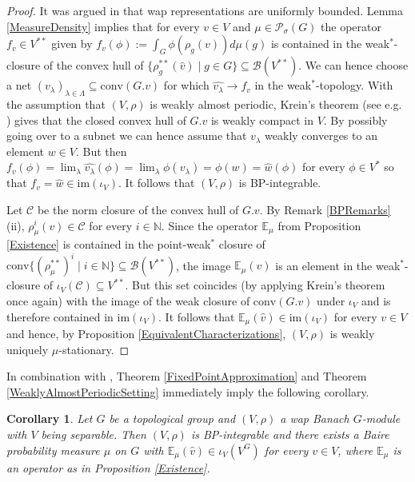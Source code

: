 \documentclass[a4paper,11pt,reqno]{amsart}
\numberwithin{equation}{section}
\newtheorem{corollary}[theorem]{Corollary}
\theoremstyle{definition}
\theoremstyle{remark}
\theoremstyle{remark}
\begin{document}
\begin{proof} It was argued in \cite{BaderRosendalSauer} that wap representations are uniformly bounded. Lemma \ref{MeasureDensity} implies that for every $v\in V$ and $\mu\in\mathcal{P}_{\sigma}(G)$ the operator $f_{v}\in V^{\ast\ast}$ given by $f_{v}(\phi):=\int_{G}\phi\left(\rho_{g}(v)\right)d\mu(g)$ is contained in the weak$^{\ast}$-closure of the convex hull of $\{\rho_{g}^{\ast\ast}(\widehat{v})\mid g\in G\}\subseteq\mathcal{B}(V^{\ast\ast})$. We can hence choose a net $(v_{\lambda})_{\lambda\in\Lambda}\subseteq\text{conv}(G.v)$ for which $\widehat{v_{\lambda}}\rightarrow f_{v}$ in the weak$^{\ast}$-topology. With the assumption that $(V,\rho)$ is weakly almost periodic, Krein's theorem (see e.g. \cite[Theorem 3.133]{FHHMZ}) gives that the closed convex hull of $G.v$ is weakly compact in $V$. By possibly going over to a subnet we can hence assume that $v_{\lambda}$ weakly converges to an element $w\in V$. But then $f_{v}(\phi)=\lim_{\lambda}\widehat{v_{\lambda}}(\phi)=\lim_{\lambda}\phi(v_{\lambda})=\phi(w)=\widehat{w}(\phi)$ for every $\phi\in V^{\ast}$ so that $f_{v}=\widehat{w}\in\text{im}(\iota_{V})$. It follows that $(V,\rho)$ is BP-integrable.

Let $\mathcal{C}$ be the norm closure of the convex hull of $G.v$. By Remark \ref{BPRemarks} (ii), $\rho_{\mu}^{i}(v)\in\mathcal{C}$ for every $i\in\mathbb{N}$. Since the operator $\mathbb{E}_{\mu}$ from Proposition \ref{Existence} is contained in the point-weak$^{\ast}$ closure of $\text{conv}\{(\rho_{\mu}^{\ast\ast})^{i}\mid i\in\mathbb{N}\}\subseteq\mathcal{B}(V^{\ast\ast})$, the image $\mathbb{E}_{\mu}(\widehat{v})$ is an element in the weak$^{\ast}$-closure of $\iota_{V}(\mathcal{C})\subseteq V^{\ast\ast}$. But this set coincides (by applying Krein's theorem once again) with the image of the weak closure of $\text{conv}(G.v)$ under $\iota_{V}$ and is therefore contained in $\text{im}(\iota_{V})$. It follows that $\mathbb{E}_{\mu}(\widehat{v})\in\text{im}(\iota_{V})$ for every $v\in V$ and hence, by Proposition \ref{EquivalentCharacterizations}, $(V,\rho)$ is weakly uniquely $\mu$-stationary. \end{proof}

In combination with \cite[Lemma 17]{BaderRosendalSauer}, Theorem \ref{FixedPointApproximation} and Theorem \ref{WeaklyAlmostPeriodicSetting} immediately imply the following corollary.

\begin{corollary} \label{WapConditional} Let $G$ be a topological group and $(V,\rho)$ a wap Banach $G$-module with $V$ being separable. Then $(V,\rho)$ is BP-integrable and there exists a Baire probability measure $\mu$ on $G$ with $\mathbb{E}_{\mu}(\widehat{v})\in\iota_{V}(V^{G})$ for every $v\in V$, where $\mathbb{E}_{\mu}$ is an operator as in Proposition \ref{Existence}. \end{corollary}
\end{document}
